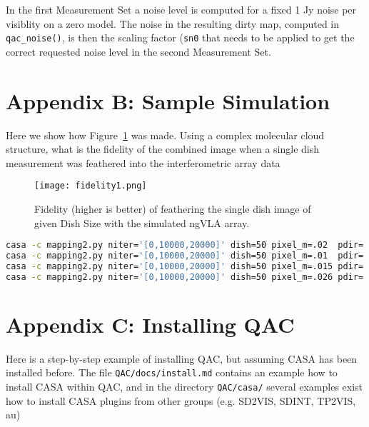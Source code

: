 \documentclass[12pt,a4paper]{article}
\begin{document}
In the first Measurement Set a noise level is computed for a fixed 1 Jy noise per visiblity on a
zero model. The noise in the resulting dirty map, computed in {\tt qac\_noise()}, is then the scaling factor ({\tt sn0}
that needs to be applied to get the correct requested noise level in the second Measurement Set.





\newpage
\section*{Appendix B: Sample Simulation}

Here we show how Figure~\ref{fig:fidelity} was made. Using a complex molecular cloud structure,
what is the fidelity of the combined image when a single dish measurement was feathered into
the interferometric array data





\begin{figure}[h!]
\centering
\texttt{[image: fidelity1.png]}
\caption{Fidelity (higher is better) of feathering the single dish image of given
  Dish Size with the simulated ngVLA array.
  }
\label{fig:fidelity}
\end{figure}


\begin{lstlisting}[language=bash]
casa -c mapping2.py niter='[0,10000,20000]' dish=50 pixel_m=.02  pdir='"exp1"' > exp1.log 2>&1
casa -c mapping2.py niter='[0,10000,20000]' dish=50 pixel_m=.01  pdir='"exp2"' > exp2.log 2>&1
casa -c mapping2.py niter='[0,10000,20000]' dish=50 pixel_m=.015 pdir='"exp3"' > exp3.log 2>&1
casa -c mapping2.py niter='[0,10000,20000]' dish=50 pixel_m=.026 pdir='"exp4"' > exp4.log 2>&1
\end{lstlisting}

\newpage
\section*{Appendix C: Installing QAC}

Here is a step-by-step example of installing QAC, but assuming CASA has been installed before.
The file \verb+QAC/docs/install.md+ contains an example how to install CASA within QAC, and in the
directory \verb+QAC/casa/+ several examples exist how to install CASA plugins from other groups
(e.g. SD2VIS, SDINT, TP2VIS, au)
\end{document}
